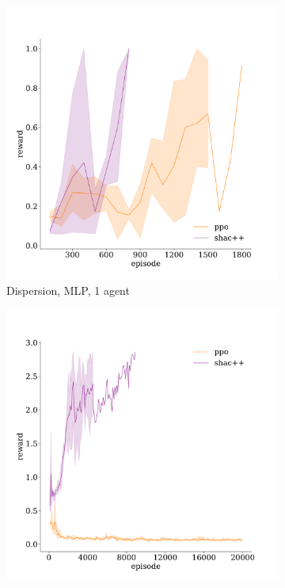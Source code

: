 \newpage
\appendix
\onecolumn

\begin{figure}[t]
    \centering
    \begin{subfigure}[b]{0.32\textwidth}
        \includegraphics[width=\textwidth]{figs/dispersion-1-mlp.pdf}
        \caption{Dispersion, MLP, 1 agent}
        \label{apx:fig:dispersion-mlp-1}
    \end{subfigure}
    \begin{subfigure}[b]{0.32\textwidth}
        \includegraphics[width=\textwidth]{figs/dispersion-3-mlp.pdf}

\end{subfigure}
\end{figure}
